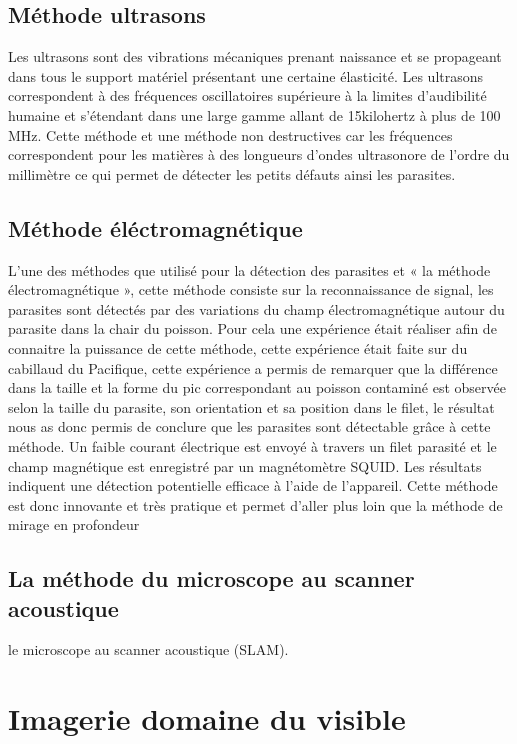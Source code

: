 \documentclass[12pt,a4paper]{article}
\begin{document}
\subsection{Méthode ultrasons}

Les ultrasons sont des vibrations mécaniques prenant naissance et se propageant dans tous le support matériel présentant une certaine élasticité.
Les ultrasons correspondent à des fréquences oscillatoires supérieure à la limites d’audibilité humaine et s’étendant dans une large gamme allant de 15kilohertz à plus de 100 MHz.
Cette méthode et une méthode non destructives car les fréquences correspondent pour les matières à des longueurs d’ondes ultrasonore de l’ordre du millimètre ce qui permet de détecter les petits défauts ainsi les parasites. 

\subsection{Méthode éléctromagnétique}

L’une des méthodes que utilisé pour la détection des parasites et  « la méthode électromagnétique », cette méthode consiste sur la reconnaissance de signal, les parasites sont détectés  par des variations du champ électromagnétique autour du parasite dans la chair du poisson.
Pour cela une expérience était réaliser afin de connaitre la puissance de cette méthode, cette expérience était faite sur du cabillaud du Pacifique, cette expérience a permis de remarquer que la différence dans la taille et la forme du pic correspondant au poisson contaminé est observée selon la taille du parasite, son orientation et sa position dans le filet, le résultat nous as donc permis  de conclure que les parasites sont détectable grâce à cette méthode. Un faible courant électrique est envoyé à travers un filet parasité et le champ magnétique est enregistré par un magnétomètre SQUID. Les résultats indiquent une détection potentielle efficace à l'aide de l'appareil.
Cette méthode est donc innovante et très pratique et permet d’aller plus loin que la méthode de mirage en profondeur



\subsection{La méthode du  microscope au scanner acoustique}
le microscope au scanner acoustique (SLAM).


\section{Imagerie domaine du visible}
\end{document}
